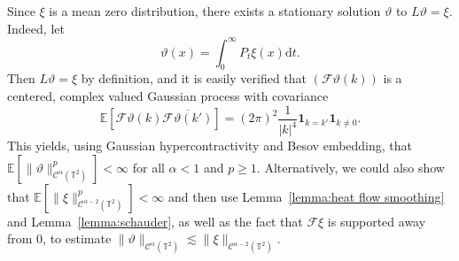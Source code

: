 \documentclass[11pt,a4paper]{article}
\newcommand{\mathd}{\mathrm{d}}
\theoremstyle{remark}
\newcommand{\R}{\mathbb{R}}
\newcommand{\E}{\mathbb{E}}
\newcommand{\CC}{\ensuremath{\mathscr{C}}}
\newcommand{\CF}{\ensuremath{\mathscr{F}}}
\newcommand{\CS}{\ensuremath{\mathscr{S}}}
\begin{document}
%

Since $\xi$ is a mean zero distribution, there exists a stationary solution $\vartheta$ to $L \vartheta = \xi$. Indeed, let
\[
   \vartheta(x) = \int_0^\infty P_t \xi (x) \mathd t.
\]
Then $L \vartheta = \xi$ by definition, and it is easily verified that $(\CF \vartheta(k))$ is a centered, complex valued Gaussian process with covariance
\[
   \E[ \CF \vartheta(k) \overline{\CF \vartheta(k')}] = (2\pi)^2 \frac{1}{|k|^4} \mathbf{1}_{k = k'} \mathbf{1}_{k \neq 0}.
\]
This yields, using Gaussian hypercontractivity and Besov embedding, that $\E[\| \vartheta\|_{\CC^\alpha(\mathbb{T}^2)}^p] < \infty$ for all $\alpha < 1$ and $p \ge 1$. Alternatively, we could also show that $\E[\|\xi\|_{\CC^{\alpha-2}(\mathbb{T}^2)}^p] < \infty$ and then use Lemma~\ref{lemma:heat flow smoothing} and Lemma~\ref{lemma:schauder}, as well as the fact that $\CF \xi$ is supported away from 0, to estimate $\| \vartheta\|_{\CC^\alpha(\mathbb{T}^2)} \lesssim \|\xi \|_{\CC^{\alpha-2}(\mathbb{T}^2)}$.

%
%
%
%
%
\end{document}
